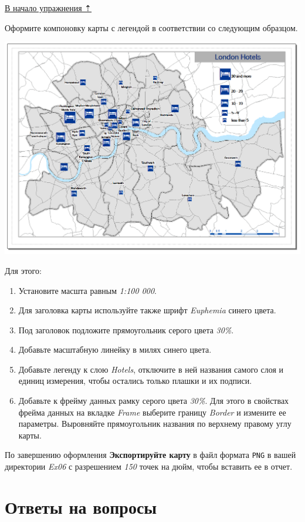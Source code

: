 \documentclass[]{book}
\theoremstyle{definition}
\theoremstyle{definition}
\theoremstyle{definition}
\theoremstyle{remark}
\begin{document}
\protect\hyperlink{map-ref-economic}{В начало упражнения ⇡}

Оформите компоновку карты с легендой в соответствии со следующим
образцом.

\includegraphics{images/Ex06/image27.png}

Для этого:

\begin{enumerate}
\def\labelenumi{\arabic{enumi}.}
\item
  Установите масшта равным \emph{1:100 000}.
\item
  Для заголовка карты используйте также шрифт \emph{Euphemia} синего
  цвета.
\item
  Под заголовок подложите прямоугольник серого цвета \emph{30\%}.
\item
  Добавьте масштабную линейку в милях синего цвета.
\item
  Добавьте легенду к слою \emph{Hotels}, отключите в ней названия самого
  слоя и единиц измерения, чтобы остались только плашки и их подписи.
\item
  Добавьте к фрейму данных рамку серого цвета \emph{30\%}. Для этого в
  свойствах фрейма данных на вкладке \emph{Frame} выберите границу
  \emph{Border} и измените ее параметры. Выровняйте прямоугольник
  названия по верхнему правому углу карты.
\end{enumerate}

По завершению оформления \textbf{Экспортируйте карту} в файл формата
\texttt{PNG} в вашей директории \emph{Ex06} с разрешением \emph{150}
точек на дюйм, чтобы вставить ее в отчет.

\hypertarget{map-ref-economic-questions}{%
\section{Ответы на вопросы}\label{map-ref-economic-questions}}
\end{document}
